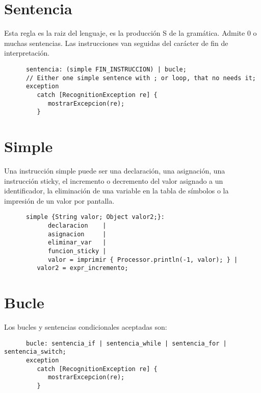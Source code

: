    \section{Sentencia}
   Esta regla es la raiz del lenguaje, es la producción S de la gramática. Admite 0 o muchas sentencias. Las instrucciones van seguidas
   del carácter de fin de interpretación.
   \begin{lstlisting}
      sentencia: (simple FIN_INSTRUCCION) | bucle; 
      // Either one simple sentence with ; or loop, that no needs it;
      exception
         catch [RecognitionException re] {
            mostrarExcepcion(re);
         }
   \end{lstlisting}

   \section{Simple}
   Una instrucción simple puede ser una declaración, una asignación, una instrucción sticky, el incremento o decremento del valor 
   asignado a un identificador, la eliminación de una variable en la tabla de símbolos o la impresión de un valor por pantalla.
   \begin{lstlisting}
      simple {String valor; Object valor2;}:  
            declaracion    | 
            asignacion     | 
            eliminar_var   | 
            funcion_sticky | 
            valor = imprimir { Processor.println(-1, valor); } | 
         valor2 = expr_incremento;
   \end{lstlisting}

   \section{Bucle}
   Los bucles y sentencias condicionales aceptadas son:
   \begin{lstlisting}
      bucle: sentencia_if | sentencia_while | sentencia_for | sentencia_switch;
      exception
         catch [RecognitionException re] {
            mostrarExcepcion(re);
         }
   \end{lstlisting}

